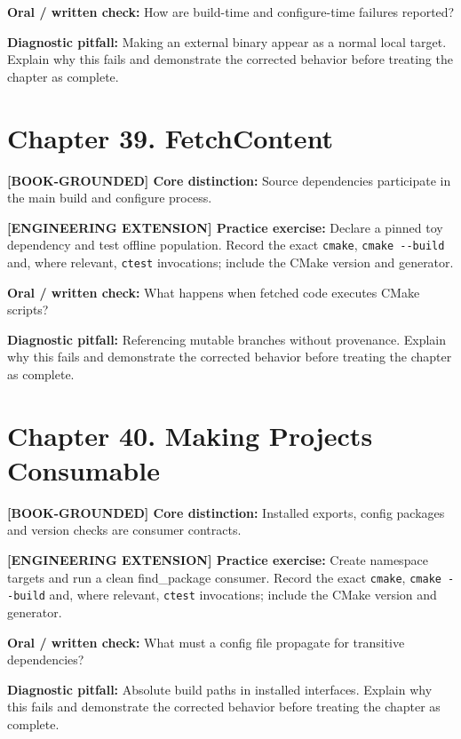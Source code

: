 \documentclass[11pt,letterpaper,oneside]{report}
\providecommand{\passthrough}[1]{#1}
\begin{document}
\textbf{Oral / written check:} How are build-time and configure-time
failures reported?

\textbf{Diagnostic pitfall:} Making an external binary appear as a
normal local target. Explain why this fails and demonstrate the
corrected behavior before treating the chapter as complete.

\section{Chapter 39. FetchContent}\label{chapter-39.-fetchcontent}

\textbf{{[}BOOK-GROUNDED{]} Core distinction:} Source dependencies
participate in the main build and configure process.

\textbf{{[}ENGINEERING EXTENSION{]} Practice exercise:} Declare a pinned
toy dependency and test offline population. Record the exact
\passthrough{\lstinline!cmake!}, \passthrough{\lstinline!cmake --build!}
and, where relevant, \passthrough{\lstinline!ctest!} invocations;
include the CMake version and generator.

\textbf{Oral / written check:} What happens when fetched code executes
CMake scripts?

\textbf{Diagnostic pitfall:} Referencing mutable branches without
provenance. Explain why this fails and demonstrate the corrected
behavior before treating the chapter as complete.

\section{Chapter 40. Making Projects
Consumable}\label{chapter-40.-making-projects-consumable}

\textbf{{[}BOOK-GROUNDED{]} Core distinction:} Installed exports, config
packages and version checks are consumer contracts.

\textbf{{[}ENGINEERING EXTENSION{]} Practice exercise:} Create namespace
targets and run a clean find\_package consumer. Record the exact
\passthrough{\lstinline!cmake!}, \passthrough{\lstinline!cmake --build!}
and, where relevant, \passthrough{\lstinline!ctest!} invocations;
include the CMake version and generator.

\textbf{Oral / written check:} What must a config file propagate for
transitive dependencies?

\textbf{Diagnostic pitfall:} Absolute build paths in installed
interfaces. Explain why this fails and demonstrate the corrected
behavior before treating the chapter as complete.
\end{document}
